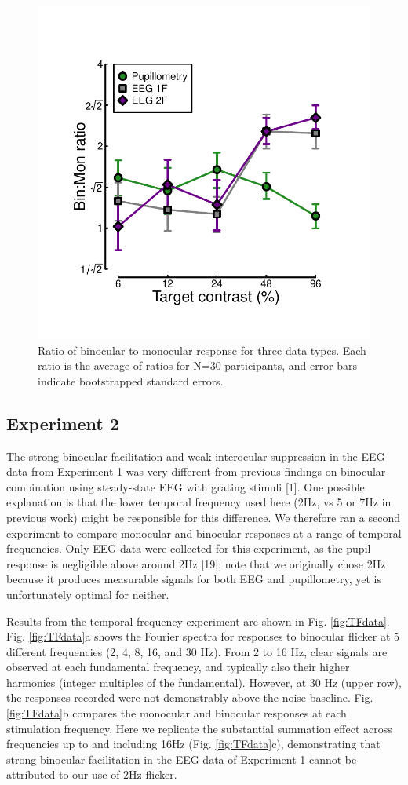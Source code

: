 \documentclass[
]{article}
\begin{document}
\begin{figure}

{\centering \includegraphics[width=0.5\linewidth]{Figures/BSratios} 

}

\caption{Ratio of binocular to monocular response for three data types. Each ratio is the average of ratios for N=30 participants, and error bars indicate bootstrapped standard errors.}\label{fig:BSratios}
\end{figure}

\hypertarget{experiment-2}{%
\subsection{Experiment 2}\label{experiment-2}}

The strong binocular facilitation and weak interocular suppression in the EEG data from Experiment 1 was very different from previous findings on binocular combination using steady-state EEG with grating stimuli {[}1{]}. One possible explanation is that the lower temporal frequency used here (2Hz, vs 5 or 7Hz in previous work) might be responsible for this difference. We therefore ran a second experiment to compare monocular and binocular responses at a range of temporal frequencies. Only EEG data were collected for this experiment, as the pupil response is negligible above around 2Hz {[}19{]}; note that we originally chose 2Hz because it produces measurable signals for both EEG and pupillometry, yet is unfortunately optimal for neither.

Results from the temporal frequency experiment are shown in Fig. \ref{fig:TFdata}. Fig. \ref{fig:TFdata}a shows the Fourier spectra for responses to binocular flicker at 5 different frequencies (2, 4, 8, 16, and 30 Hz). From 2 to 16 Hz, clear signals are observed at each fundamental frequency, and typically also their higher harmonics (integer multiples of the fundamental). However, at 30 Hz (upper row), the responses recorded were not demonstrably above the noise baseline. Fig. \ref{fig:TFdata}b compares the monocular and binocular responses at each stimulation frequency. Here we replicate the substantial summation effect across frequencies up to and including 16Hz (Fig. \ref{fig:TFdata}c), demonstrating that strong binocular facilitation in the EEG data of Experiment 1 cannot be attributed to our use of 2Hz flicker.
\end{document}
